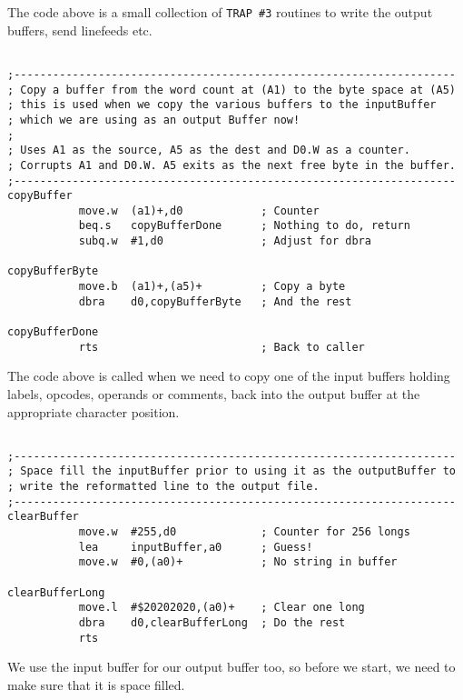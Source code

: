 The code above is a small collection of \texttt{TRAP \#3} routines to write the output buffers, send linefeeds etc.

\begin{lstlisting}[firstnumber=last,caption={ASMReformat Source - Copying Buffers Around}]

;--------------------------------------------------------------------
; Copy a buffer from the word count at (A1) to the byte space at (A5)
; this is used when we copy the various buffers to the inputBuffer
; which we are using as an output Buffer now!
;
; Uses A1 as the source, A5 as the dest and D0.W as a counter.
; Corrupts A1 and D0.W. A5 exits as the next free byte in the buffer.
;--------------------------------------------------------------------
copyBuffer
           move.w  (a1)+,d0            ; Counter
           beq.s   copyBufferDone      ; Nothing to do, return
           subq.w  #1,d0               ; Adjust for dbra

copyBufferByte
           move.b  (a1)+,(a5)+         ; Copy a byte
           dbra    d0,copyBufferByte   ; And the rest

copyBufferDone
           rts                         ; Back to caller
\end{lstlisting}

The code above is called when we need to copy one of the input buffers holding labels, opcodes, operands or comments, back into the output buffer at the appropriate character position.

\begin{lstlisting}[firstnumber=last,caption={ASMReformat Source - Clearing the Input Buffer}]

;--------------------------------------------------------------------
; Space fill the inputBuffer prior to using it as the outputBuffer to
; write the reformatted line to the output file.
;--------------------------------------------------------------------
clearBuffer
           move.w  #255,d0             ; Counter for 256 longs
           lea     inputBuffer,a0      ; Guess!
           move.w  #0,(a0)+            ; No string in buffer

clearBufferLong
           move.l  #$20202020,(a0)+    ; Clear one long
           dbra    d0,clearBufferLong  ; Do the rest 
           rts
\end{lstlisting}

We use the input buffer for our output buffer too, so before we start, we need to make sure that it is space filled.

